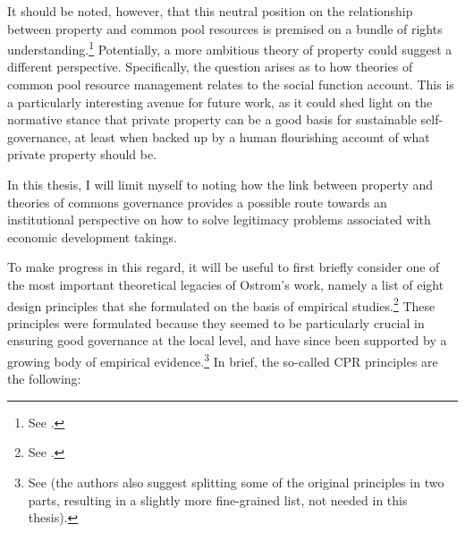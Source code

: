 It should be noted, however, that this neutral position on the relationship between property and common pool resources is premised on a bundle of rights understanding.\footnote{See \cite[59]{ostrom10b}.} Potentially, a more ambitious theory of property could suggest a different perspective. Specifically, the question arises as to how theories of common pool resource management relates to the social function account. This is a particularly interesting avenue for future work, as it could shed light on the normative stance that private property can be a good basis for sustainable self-governance, at least when backed up by a human flourishing account of what private property should be.

In this thesis, I will limit myself to noting how the link between property and theories of commons governance provides a possible route towards an institutional perspective on how to solve legitimacy problems associated with economic development takings.  %

To make progress in this regard, it will be useful to first briefly consider one of the most important theoretical legacies of Ostrom's work, namely a list of eight design principles that she formulated on the basis of empirical studies.\footnote{See \cite[90]{ostrom90}.} These principles were formulated because they seemed to be particularly crucial in ensuring good governance at the local level, and have since been supported by a growing body of empirical evidence.\footnote{See \cite{cox10} (the authors also suggest splitting some of the original principles in two parts, resulting in a slightly more fine-grained list, not needed in this thesis). } In brief, the so-called CPR principles are the following:

